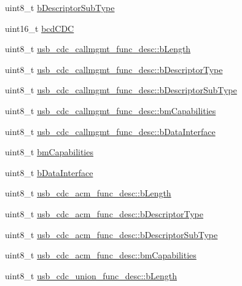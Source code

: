 \begin{DoxyCompactItemize}
\item 
uint8\-\_\-t \hyperlink{group___p_i_o_s___u_s_b___d_e_f_s_ga7569c561e3556e7df6b24aed1ff66f28}{b\-Descriptor\-Sub\-Type}
\item 
uint16\-\_\-t \hyperlink{group___p_i_o_s___u_s_b___d_e_f_s_ga2bffb583550e4d83b4a2a4d735ece97f}{bcd\-C\-D\-C}
\item 
uint8\-\_\-t \hyperlink{group___p_i_o_s___u_s_b___d_e_f_s_ga987115acb21ed11d7cf4255dc3224efb}{usb\-\_\-cdc\-\_\-callmgmt\-\_\-func\-\_\-desc\-::b\-Length}
\item 
uint8\-\_\-t \hyperlink{group___p_i_o_s___u_s_b___d_e_f_s_gaeec8cc78a5f92025f5599a0f82a33b77}{usb\-\_\-cdc\-\_\-callmgmt\-\_\-func\-\_\-desc\-::b\-Descriptor\-Type}
\item 
uint8\-\_\-t \hyperlink{group___p_i_o_s___u_s_b___d_e_f_s_ga7939fdf3f4d0475126d3b6055a11e7bb}{usb\-\_\-cdc\-\_\-callmgmt\-\_\-func\-\_\-desc\-::b\-Descriptor\-Sub\-Type}
\item 
uint8\-\_\-t \hyperlink{group___p_i_o_s___u_s_b___d_e_f_s_ga48fbc5fa8369d703a7bdc6c51400cbeb}{usb\-\_\-cdc\-\_\-callmgmt\-\_\-func\-\_\-desc\-::bm\-Capabilities}
\item 
uint8\-\_\-t \hyperlink{group___p_i_o_s___u_s_b___d_e_f_s_ga9b0af922aee941d19a36f9cc309e0094}{usb\-\_\-cdc\-\_\-callmgmt\-\_\-func\-\_\-desc\-::b\-Data\-Interface}
\item 
uint8\-\_\-t \hyperlink{group___p_i_o_s___u_s_b___d_e_f_s_ga881b7a2d441c1074050bb06c058b680c}{bm\-Capabilities}
\item 
uint8\-\_\-t \hyperlink{group___p_i_o_s___u_s_b___d_e_f_s_ga69219cd97dd6c69e7d5b798d9251ce5f}{b\-Data\-Interface}
\item 
uint8\-\_\-t \hyperlink{group___p_i_o_s___u_s_b___d_e_f_s_gacda28d39ca47f4d77a24b7617ac2d693}{usb\-\_\-cdc\-\_\-acm\-\_\-func\-\_\-desc\-::b\-Length}
\item 
uint8\-\_\-t \hyperlink{group___p_i_o_s___u_s_b___d_e_f_s_ga10040b1863323e237a9c86859baaecb4}{usb\-\_\-cdc\-\_\-acm\-\_\-func\-\_\-desc\-::b\-Descriptor\-Type}
\item 
uint8\-\_\-t \hyperlink{group___p_i_o_s___u_s_b___d_e_f_s_ga08c4c22a13b05fac74e5f42a8a5bde68}{usb\-\_\-cdc\-\_\-acm\-\_\-func\-\_\-desc\-::b\-Descriptor\-Sub\-Type}
\item 
uint8\-\_\-t \hyperlink{group___p_i_o_s___u_s_b___d_e_f_s_gae29c71f4304b1f38e5ffcaf34ec9b182}{usb\-\_\-cdc\-\_\-acm\-\_\-func\-\_\-desc\-::bm\-Capabilities}
\item 
uint8\-\_\-t \hyperlink{group___p_i_o_s___u_s_b___d_e_f_s_ga2175f86e94200d579781fa41c37c9bc1}{usb\-\_\-cdc\-\_\-union\-\_\-func\-\_\-desc\-::b\-Length}

\end{DoxyCompactItemize}
